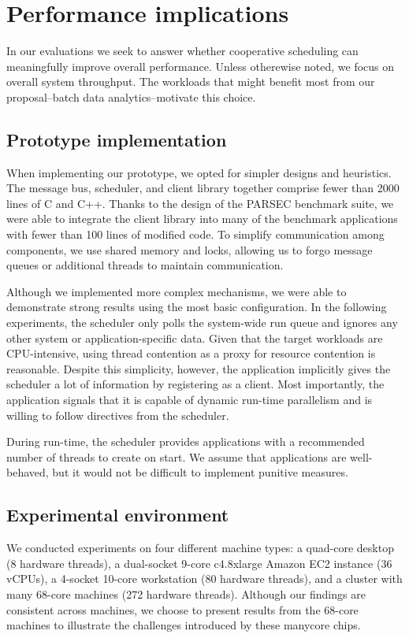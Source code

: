 \section{Performance implications}
In our evaluations we seek to answer whether cooperative scheduling can meaningfully improve overall performance. Unless otherewise noted, we focus on overall system throughput. The workloads that might benefit most from our proposal--batch data analytics--motivate this choice.


\subsection{Prototype implementation}
When implementing our prototype, we opted for simpler designs and heuristics. The message bus, scheduler, and client library together comprise fewer than 2000 lines of C and C++. Thanks to the design of the PARSEC benchmark suite, we were able to integrate the client library into many of the benchmark applications with fewer than 100 lines of modified code. To simplify communication among components, we use shared memory and locks, allowing us to forgo message queues or additional threads to maintain communication.

Although we implemented more complex mechanisms, we were able to demonstrate strong results using the most basic configuration. In the following experiments, the scheduler only polls the system-wide run queue and ignores any other system or application-specific data. Given that the target workloads are CPU-intensive, using thread contention as a proxy for resource contention is reasonable. Despite this simplicity, however, the application implicitly gives the scheduler a lot of information by registering as a client. Most importantly, the application signals that it is capable of dynamic run-time parallelism and is willing to follow directives from the scheduler.

During run-time, the scheduler provides applications with a recommended number of threads to create on start. We assume that applications are well-behaved, but it would not be difficult to implement punitive measures.

\subsection{Experimental environment}
We conducted experiments on four different machine types: a quad-core desktop (8 hardware threads), a dual-socket 9-core c4.8xlarge Amazon EC2 instance (36 vCPUs), a 4-socket 10-core workstation (80 hardware threads), and a cluster with many 68-core machines (272 hardware threads). Although our findings are consistent across machines, we choose to present results from the 68-core machines to illustrate the challenges introduced by these manycore chips.

